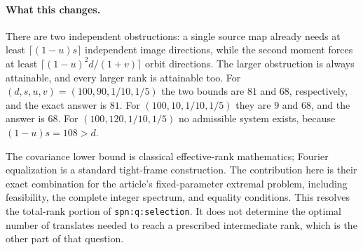 \paragraph{What this changes.}
There are two independent obstructions: a single source map already
needs at least $\lceil(1-u)s\rceil$ independent image directions, while
the second moment forces at least
$\lceil(1-u)^2d/(1+v)\rceil$ orbit directions. The larger obstruction is
always attainable, and every larger rank is attainable too. For
$(d,s,u,v)=(100,90,1/10,1/5)$ the two bounds are $81$ and $68$,
respectively, and the exact answer is $81$. For
$(100,10,1/10,1/5)$ they are $9$ and $68$, and the answer is $68$.
For $(100,120,1/10,1/5)$ no admissible system exists, because
$(1-u)s=108>d$.

The covariance lower bound is classical effective-rank mathematics;
Fourier equalization is a standard tight-frame construction. The
contribution here is their exact combination for the article's
fixed-parameter extremal problem, including feasibility, the complete
integer spectrum, and equality conditions. This resolves the
total-rank portion of \texttt{spn:q:selection}. It does not determine
the optimal number of translates needed to reach a prescribed
intermediate rank, which is the other part of that question.
